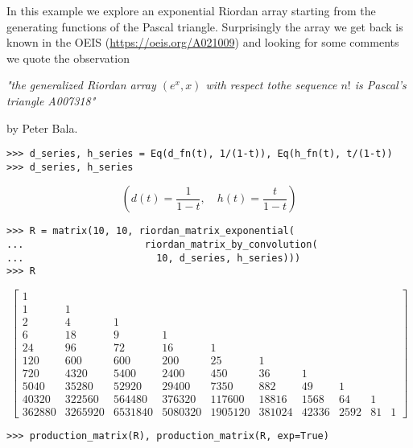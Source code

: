 \begin{example}
In this example we explore an exponential Riordan array starting from the
generating functions of the Pascal triangle. Surprisingly the array we get back
is known in the OEIS (\url{https://oeis.org/A021009}) and looking for some
comments we quote the observation\newline
\begin{center} 
\textit{"the generalized Riordan array $(e^x, x)$ with respect
to\newline the sequence $n!$ is Pascal's triangle A007318"} 
\end{center} 
by Peter Bala.
\begin{verbatim}
>>> d_series, h_series = Eq(d_fn(t), 1/(1-t)), Eq(h_fn(t), t/(1-t))
>>> d_series, h_series
\end{verbatim}
\begin{displaymath}
\left ( d{\left (t \right )} = \frac{1}{1-t}, \quad h{\left (t \right )} = \frac{t}{1-t}\right )
\end{displaymath}
\begin{verbatim}
>>> R = matrix(10, 10, riordan_matrix_exponential(
...                     riordan_matrix_by_convolution(
...                       10, d_series, h_series)))
>>> R
\end{verbatim}
\begin{displaymath}
\left[\begin{matrix}1 &   &   &   &   &   &   &   &   &  \\1 & 1 &   &   &   &   &   &   &   &  \\2 & 4 & 1 &   &   &   &   &   &   &  \\6 & 18 & 9 & 1 &   &   &   &   &   &  \\24 & 96 & 72 & 16 & 1 &   &   &   &   &  \\120 & 600 & 600 & 200 & 25 & 1 &   &   &   &  \\720 & 4320 & 5400 & 2400 & 450 & 36 & 1 &   &   &  \\5040 & 35280 & 52920 & 29400 & 7350 & 882 & 49 & 1 &   &  \\40320 & 322560 & 564480 & 376320 & 117600 & 18816 & 1568 & 64 & 1 &  \\362880 & 3265920 & 6531840 & 5080320 & 1905120 & 381024 & 42336 & 2592 & 81 & 1\end{matrix}\right]
\end{displaymath}
\begin{verbatim}
>>> production_matrix(R), production_matrix(R, exp=True)

\end{verbatim}
\end{example}
